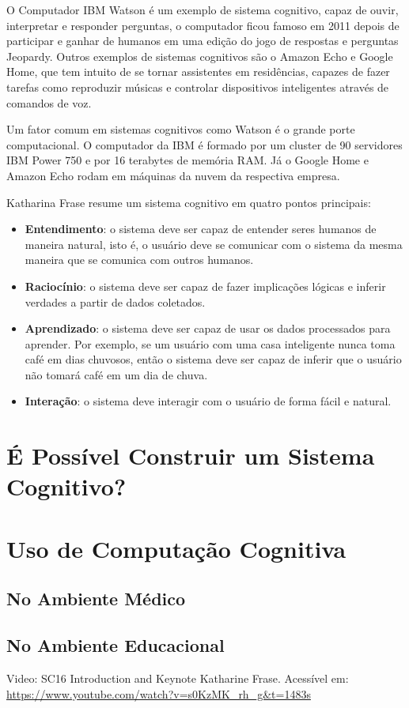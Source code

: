 \documentclass[12pt]{article}
\begin{document}
O Computador IBM Watson é um exemplo de sistema cognitivo, capaz de 
ouvir, interpretar e responder perguntas, o computador ficou famoso 
em 2011 depois de participar e ganhar de humanos em uma edição do jogo 
de respostas e perguntas Jeopardy. Outros exemplos de sistemas 
cognitivos são o Amazon Echo e Google Home, que tem intuito de se tornar
assistentes em residências, capazes de fazer tarefas como reproduzir
músicas e controlar dispositivos inteligentes através de comandos de
voz.

Um fator comum em sistemas cognitivos como Watson é o grande porte 
computacional. O computador da IBM é formado por um cluster de 90 
servidores IBM Power 750 e por 16 terabytes de memória RAM. Já o
Google Home e Amazon Echo rodam em máquinas da nuvem da respectiva
empresa.

Katharina Frase resume um sistema cognitivo em quatro pontos principais:
\begin{itemize}
\item{\textbf {Entendimento}:} o sistema deve ser capaz de entender 
seres humanos de maneira natural, isto é, o usuário deve se comunicar
com o sistema da mesma maneira que se comunica com outros humanos.

\item{\textbf {Raciocínio}:} o sistema deve ser capaz de fazer
implicações lógicas e inferir verdades a partir de dados coletados.

\item{\textbf {Aprendizado}:} o sistema deve ser capaz de usar os dados 
processados para aprender. Por exemplo, se um usuário com uma casa 
inteligente nunca toma café em dias chuvosos, então o sistema deve ser
capaz de inferir que o usuário não tomará café em um dia de chuva.

\item{\textbf {Interação}:} o sistema deve interagir com o usuário de 
forma fácil e natural.

\end{itemize}

\pagebreak
\section{É Possível Construir um Sistema Cognitivo?}

\pagebreak
\section{Uso de Computação Cognitiva}
\subsection{No Ambiente Médico}
\subsection{No Ambiente Educacional}


\pagebreak
\begin{thebibliography}{1}
 Video: SC16 Introduction and Keynote
    Katharine Frase. Acessível em: 
    \url{https://www.youtube.com/watch?v=s0KzMK_rh_g&t=1483s}
\end{thebibliography}
\end{document}
